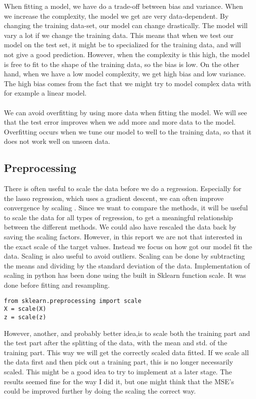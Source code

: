 When fitting a model, we have do a trade-off between bias and variance. When we increase the complexity, the model we get are very data-dependent. By changing the training data-set, our model can change drastically. The model will vary a lot if we change the training data. This means that when we test our model on the test set, it might be to specialized for the training data, and will not give a good prediction. However, when the complexity is this high, the model is free to fit to the shape of the training data, so the bias is low. On the other hand, when we have a low model complexity, we get high bias and low variance. The high bias comes from the fact that we might try to model complex data with for example a linear model. 
\\
\\
We can avoid overfitting by using more data when fitting the model. We will see that the test error improves when we add more and more data to the model. Overfitting occurs when we tune our model to well to the training data, so that it does not work well on unseen data.  \\
\subsection{Preprocessing}
There is often useful to scale the data before we do a regression. Especially for the lasso regression, which uses a gradient descent, we can often improve convergence by scaling \cite{NumOpt}. Since we want to compare the methods, it will be useful to scale the data for all types of regression, to get a meaningful relationship between the different methods. We could also have rescaled the data back by saving the scaling factors. However, in this report we are not that interested in the exact scale of the target values. Instead we focus on how got our model fit the data. Scaling is also useful to avoid outliers.
Scaling can be done by subtracting the means and dividing by the standard deviation of the data.\cite{Hands-On} Implementation of scaling in python has been done using the built in Sklearn function scale. It was done before fitting and resampling. 
\begin{lstlisting}
from sklearn.preprocessing import scale
X = scale(X)
z = scale(z)
\end{lstlisting}
However, another, and probably better idea,is to scale both the training part and the test part after the splitting of the data, with the mean and std. of the training part. This way we will get the correctly scaled data fitted. If we scale all the data first and then pick out a training part, this is no longer necessarily scaled. This might be a good idea to try to implement at a later stage. The results seemed fine for the way I did it, but one might think that the MSE's could be improved further by doing the scaling the correct way. 



